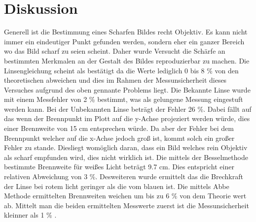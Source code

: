 \section{Diskussion}
\label{sec:Diskussion}
Generell ist die Bestimmung eines Scharfen Bildes recht Objektiv. Es kann nicht immer ein eindeutiger Punkt gefunden werden, sondern eher ein ganzer Bereich wo das Bild scharf zu seien scheint. Daher wurde Versucht die Schärfe an bestimmten Merkmalen an der Gestalt des Bildes reproduzierbar zu machen. 
Die Linsengleichung scheint als bestätigt da die Werte lediglich 0 bis 8 \% von den theoretischen abweichen und dies im Rahmen der Messunsicherheit dieses Versuches aufgrund des oben gennante Problems liegt.
Die Bekannte Linse wurde mit einem Messfehler von 2 \% bestimmt, was als gelungene Messung eingestuft werden kann. 
Bei der Unbekannten Linse beträgt der Fehler 26 \%. Dabei fällt auf das wenn der Brennpunkt im Plott auf die y-Achse projeziert werden würde, dies einer Brennweite von 15 cm entsprechen würde. Da aber der Fehler bei dem Brennpunkt welcher auf  die x-Achse jedoch groß ist, kommt solch ein großer Fehler zu stande. Diesliegt womöglich daran, dass ein Bild welches rein Objektiv als scharf empfunden wird, dies nicht wirklich ist.
Die mittels der Besselmethode bestimmte Brennweite für weißes Licht beträgt 9.7 cm. Dies entspricht einer relativen Abweichung von 3 \%. Desweiteren wurde ermittelt das die Brechkraft der Linse bei rotem licht geringer als die vom blauen ist.
Die mittels Abbe Methode ermittelten Brennweiten weichen um bis zu 6 \% von dem Theorie wert ab. Mittelt man die beiden ermittelten Messwerte zuerst ist die Messunsicherheit kleinner als 1 \% . 

